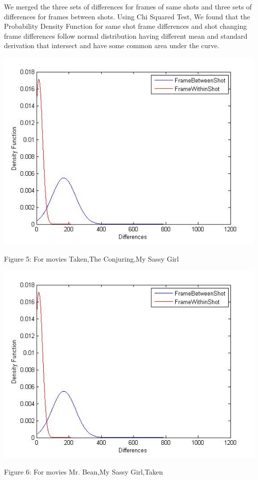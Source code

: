 \documentclass[twocolumn,twoside]{article}
\begin{document}
		
		We merged the three sets of differences for frames of same shots and three sets of differences for frames between shots. Using Chi
Squared Test, We found that the Probability Density Function for same shot frame differences and shot changing frame differences follow normal distribution having different mean and standard derivation that intersect and have some common area under the curve.

		\begin{center}
				\includegraphics[scale=0.4]{bean_97}
		\end{center}
		\vspace{-0.6cm}
		\begin{center}
				{\tiny Figure 5: For movies Taken,The Conjuring,My Sassy Girl}
		\end{center}
		\begin{center}
				\includegraphics[scale=0.4]{conjuring_97}
		\end{center}
		\vspace{-0.6cm}
		\begin{center}
				{\tiny Figure 6: For movies Mr. Bean,My Sassy Girl,Taken}
		\end{center}
		
\end{document}
